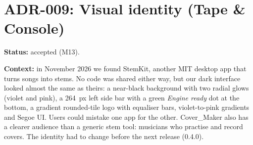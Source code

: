 \section{ADR-009: Visual identity (Tape \& Console)}
\textbf{Status:} accepted (M13).

\textbf{Context:} in November 2026 we found StemKit, another MIT desktop app
that turns songs into stems. No code was shared either way, but our dark
interface looked almost the same as theirs: a near-black background with two
radial glows (violet and pink), a 264~px left side bar with a green
\emph{Engine ready} dot at the bottom, a gradient rounded-tile logo with
equaliser bars, violet-to-pink gradients and Segoe UI. Users could mistake one
app for the other. Cover\_Maker also has a clearer audience than a generic
stem tool: musicians who practise and record covers. The identity had to
change before the next release (0.4.0).

